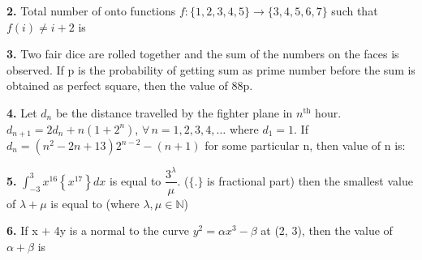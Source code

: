 \documentclass[10pt,twocolumn]{extarticle}
\begin{document}
\textbf{2.} Total number of onto functions $f:\{1,2,3,4,5\}\to\{3,4,5,6,7\}$ such that $f(i)\ne i+2$ is

\textbf{3.} Two fair dice are rolled together and the sum of the numbers on the faces is observed. If p is the probability of getting sum as prime number before the sum is obtained as perfect square, then the value of 88p.

\textbf{4.} Let $d_n$ be the distance travelled by the fighter plane in $n^{\text{th}}$ hour. $d_{n+1}=2d_n+n(1+2^n)$, $\forall\, n=1,2,3,4,\ldots$ where $d_1=1$. If $d_n=(n^2-2n+13)2^{n-2}-(n+1)$ for some particular n, then value of n is:

\textbf{5.} $\displaystyle\int_{-3}^{3} x^{16}\left\{x^{17}\right\}dx$ is equal to $\dfrac{3^\lambda}{\mu}$. ($\{.\}$ is fractional part) then the smallest value of $\lambda+\mu$ is equal to (where $\lambda,\mu\in\mathbb{N}$)

\textbf{6.} If x $+$ 4y is a normal to the curve $y^2=\alpha x^3-\beta$ at (2, 3), then the value of $\alpha+\beta$ is
\end{document}
